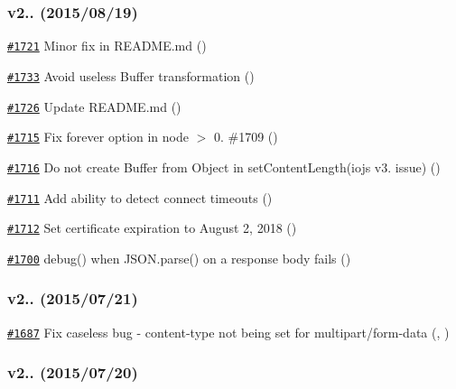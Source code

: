 \subsubsection*{v2.. (2015/08/19)}


\begin{DoxyItemize}
\item \href{https://github.com/request/request/pull/1721}{\tt \#1721} Minor fix in R\+E\+A\+D\+M\+E.\+md ()
\item \href{https://github.com/request/request/pull/1733}{\tt \#1733} Avoid useless Buffer transformation ()
\item \href{https://github.com/request/request/pull/1726}{\tt \#1726} Update R\+E\+A\+D\+M\+E.\+md ()
\item \href{https://github.com/request/request/pull/1715}{\tt \#1715} Fix forever option in node $>$ 0. \#1709 ()
\item \href{https://github.com/request/request/pull/1716}{\tt \#1716} Do not create Buffer from Object in set\+Content\+Length(iojs v3. issue) ()
\item \href{https://github.com/request/request/pull/1711}{\tt \#1711} Add ability to detect connect timeouts ()
\item \href{https://github.com/request/request/pull/1712}{\tt \#1712} Set certificate expiration to August 2, 2018 ()
\item \href{https://github.com/request/request/pull/1700}{\tt \#1700} debug() when J\+S\+O\+N.\+parse() on a response body fails ()
\end{DoxyItemize}

\subsubsection*{v2.. (2015/07/21)}


\begin{DoxyItemize}
\item \href{https://github.com/request/request/pull/1687}{\tt \#1687} Fix caseless bug -\/ content-\/type not being set for multipart/form-\/data (, )
\end{DoxyItemize}

\subsubsection*{v2.. (2015/07/20)}


